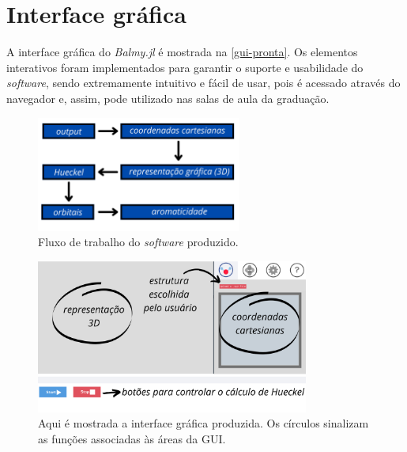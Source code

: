 \section{Interface gráfica}\label{design}

A interface gráfica do \textit{Balmy.jl} é mostrada na \autoref{gui-pronta}. Os elementos interativos foram implementados para garantir o suporte e usabilidade do \textit{software}, sendo extremamente intuitivo e fácil de usar, pois é acessado através do navegador e, assim, pode utilizado nas salas de aula da graduação.

\begin{figure}[htb]
	\caption{\label{workflow} Fluxo de trabalho do \textit{software} produzido.}
	\begin{center}
		\includegraphics[width=0.6\textwidth]{images/workflow.png}
	\end{center}
\end{figure}

\begin{figure}[htb]
	\caption{\label{gui-pronta} Aqui é mostrada a interface gráfica produzida. Os círculos sinalizam as funções associadas às áreas da \gls{GUI}.}
	\begin{center}
		\includegraphics[width=0.8\textwidth]{images/GUI-EXAMPLE.png}
	\end{center}
\end{figure}

